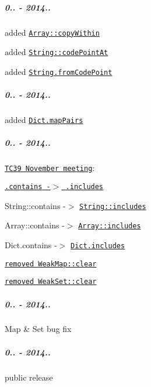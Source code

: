 \subparagraph*{0.. -\/ 2014..}


\begin{DoxyItemize}
\item added \href{https://github.com/zloirock/core-js/#ecmascript-6-array}{\tt {\ttfamily Array\+::copy\+Within}}
\item added \href{https://github.com/zloirock/core-js/#ecmascript-6-string}{\tt {\ttfamily String\+::code\+Point\+At}}
\item added \href{https://github.com/zloirock/core-js/#ecmascript-6-string}{\tt {\ttfamily String.\+from\+Code\+Point}}
\end{DoxyItemize}

\subparagraph*{0.. -\/ 2014..}


\begin{DoxyItemize}
\item added \href{https://github.com/zloirock/core-js/#dict}{\tt {\ttfamily Dict.\+map\+Pairs}}
\end{DoxyItemize}

\subparagraph*{0.. -\/ 2014..}


\begin{DoxyItemize}
\item \href{https://github.com/rwaldron/tc39-notes/tree/master/es6/2014-11}{\tt T\+C39 November meeting}\+:
\begin{DoxyItemize}
\item \href{https://github.com/rwaldron/tc39-notes/blob/master/es6/2014-11/nov-18.md#51--44-arrayprototypecontains-and-stringprototypecontains}{\tt {\ttfamily .contains} -\/$>$ {\ttfamily .includes}}
\begin{DoxyItemize}
\item {\ttfamily String\+::contains} -\/$>$ \href{https://github.com/zloirock/core-js/#ecmascript-6-string}{\tt {\ttfamily String\+::includes}}
\item {\ttfamily Array\+::contains} -\/$>$ \href{https://github.com/zloirock/core-js/#ecmascript-7-proposals}{\tt {\ttfamily Array\+::includes}}
\item {\ttfamily Dict.\+contains} -\/$>$ \href{https://github.com/zloirock/core-js/#dict}{\tt {\ttfamily Dict.\+includes}}
\end{DoxyItemize}
\item \href{https://github.com/rwaldron/tc39-notes/blob/master/es6/2014-11/nov-19.md#412-should-weakmapweakset-have-a-clear-method-markm}{\tt removed {\ttfamily Weak\+Map\+::clear}}
\item \href{https://github.com/rwaldron/tc39-notes/blob/master/es6/2014-11/nov-19.md#412-should-weakmapweakset-have-a-clear-method-markm}{\tt removed {\ttfamily Weak\+Set\+::clear}}
\end{DoxyItemize}
\end{DoxyItemize}

\subparagraph*{0.. -\/ 2014..}


\begin{DoxyItemize}
\item {\ttfamily Map} \& {\ttfamily Set} bug fix
\end{DoxyItemize}

\subparagraph*{0.. -\/ 2014..}


\begin{DoxyItemize}
\item public release 
\end{DoxyItemize}